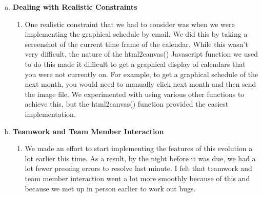 \documentclass[11pt]{article}   %
\begin{document}
\begin{enumerate} [a)]
\begin{enumerate} [$\cdot$]
\item One component we had to design was the detail display for preference-based signups. We decided that we wanted the owner to view the Slot Sign Up details modal unless all requested users have signed up for slots already and it was time for the owner to resolve the conflicts. In that case, we bring the owner to the Slot Sign Up resolution modal. After resolution, subsequent clicks of that particular slot sign up will once again take the user to the details modal. We achieved this by maintaining two flags stored within the scope for the particular slot sign up. We maintain one flag to check if the preferences for slot sign ups are complete, as in all requested users have signed up, and one flag to check if the preferences for slot sign ups are final, as in the owner has resolved any conflicts. Each time the slot sign up is clicked, we check these flags to determine which modal to display. This currently does not allow the owner to edit a slot resolution after they submit it, but adding this would simply require a button that would toggle the final flag for this particular slot sign up which would allow the owner to make changes after submission. 
\end{enumerate}
\item {\bf Dealing with Realistic Constraints}
\begin{enumerate} [$\cdot$]
\item One realistic constraint that we had to consider was when we were implementing the graphical schedule by email. We did this by taking a screenshot of the current time frame of the calendar. While this wasn't very difficult, the nature of the html2canvas() Javascript function we used to do this made it difficult to get a graphical display of calendars that you were not currently on. For example, to get a graphical schedule of the next month, you would need to manually click next month and then send the image file. We experimented with using various other functions to achieve this, but the html2canvas() function provided the easiest implementation.
\end{enumerate}
\item  {\bf Teamwork and Team Member Interaction}
\begin{enumerate} [$\cdot$]
\item We made an effort to start implementing the features of this evolution a lot earlier this time. As a result, by the night before it was due, we had a lot fewer pressing errors to resolve last minute. I felt that teamwork and team member interaction went a lot more smoothly because of this and because we met up in person earlier to work out bugs.
\end{enumerate}
\end{enumerate}
\end{document}
